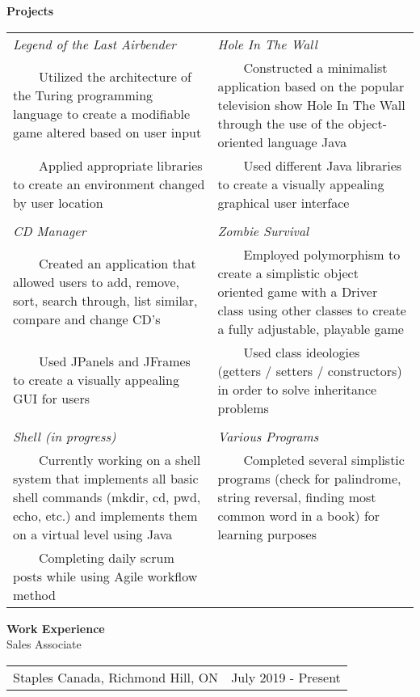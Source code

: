 \documentclass{article}
\newcommand{\tabitem}{~~\llap{\textbullet}~~}
\begin{document}
	\vspace*{0.5cm}
	\textbf{\normalsize{Projects}} \\
	\begin{tabular}{m{3.3in} m{3.3in}}
		\normalsize{ \emph{Legend of the Last Airbender}} & \normalsize{ \emph{Hole In The Wall}} \\
		\tabitem \normalsize{Utilized the architecture of the Turing programming language to create a modifiable game altered based on user input} 
		& \tabitem \normalsize{Constructed a minimalist application based on the popular television show Hole In The Wall through the use of the object-oriented language Java} \\
		\tabitem \normalsize{Applied appropriate libraries to create an environment changed by user location} 
		& \tabitem \normalsize{Used different Java libraries to create a visually appealing graphical user interface} \\
		\\[.1cm]
		\normalsize{\emph{CD Manager}} & \normalsize{\emph{Zombie Survival}} \\
		\tabitem \normalsize{Created an application that allowed users to add, remove, sort, search through, list similar, compare and change CD’s} & \tabitem \normalsize{Employed polymorphism to create a simplistic object oriented game with a Driver class using other classes to create a fully adjustable, playable game}\\
		\tabitem \normalsize{Used JPanels and JFrames to create a visually appealing GUI for users} & \tabitem \normalsize{Used class ideologies (getters / setters / constructors) in order to solve inheritance problems} \\
		\\[.1cm]
		\normalsize{\emph{Shell (in progress)}} & \normalsize{\emph{Various Programs}} \\
		\tabitem \normalsize{Currently working on a shell system that implements all basic shell commands (mkdir, cd, pwd, echo, etc.) and implements them on a virtual level using Java} & \tabitem \normalsize{Completed several simplistic programs (check for palindrome, string reversal, finding most common word in a book) for learning purposes}\\
		\tabitem \normalsize{Completing daily scrum posts while using Agile workflow method}
	\end{tabular}

	\vspace*{0.5cm}
	\textbf{Work Experience} \\
	\large{Sales Associate} \\
	\begin{tabular}{m{3.4in} m{3.3in}}
		\normalsize{Staples Canada, Richmond Hill, ON} & \hfill \hfill \normalsize{July 2019 - Present}
	\end{tabular}
	
\end{document}

